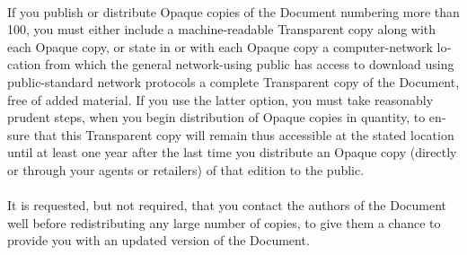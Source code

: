 \documentclass[11pt,a5paper,twoside]{book}
\begin{document}
\begin{english}
\paragraph{}If you publish or distribute Opaque copies of the Document numbering
more than 100, you must either include a machine-readable Transparent
copy along with each Opaque copy, or state in or with each Opaque copy
a computer-network location from which the general network-using
public has access to download using public-standard network protocols
a complete Transparent copy of the Document, free of added material.
If you use the latter option, you must take reasonably prudent steps,
when you begin distribution of Opaque copies in quantity, to ensure
that this Transparent copy will remain thus accessible at the stated
location until at least one year after the last time you distribute an
Opaque copy (directly or through your agents or retailers) of that
edition to the public.
\paragraph{}It is requested, but not required, that you contact the authors of the
Document well before redistributing any large number of copies, to
give them a chance to provide you with an updated version of the
Document.

\end{english}
\end{document}
